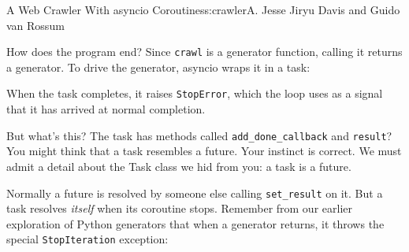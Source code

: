 \begin{aosachapter}{A Web Crawler With asyncio Coroutines}{s:crawler}{A. Jesse Jiryu Davis and Guido van Rossum}
\begin{Shaded}
\begin{Highlighting}[]
\end{Highlighting}
\end{Shaded}

How does the program end? Since \texttt{crawl} is a generator function,
calling it returns a generator. To drive the generator, asyncio wraps it
in a task:

\begin{Shaded}
\begin{Highlighting}[]
 
     
        \NormalTok{:}
         

 \NormalTok{):}

 
     
\end{Highlighting}
\end{Shaded}

When the task completes, it raises \texttt{StopError}, which the loop
uses as a signal that it has arrived at normal completion.

But what's this? The task has methods called
\texttt{add\_done\_callback} and \texttt{result}? You might think that a
task resembles a future. Your instinct is correct. We must admit a
detail about the Task class we hid from you: a task is a future.

\begin{Shaded}
\begin{Highlighting}[]
 
\end{Highlighting}
\end{Shaded}

Normally a future is resolved by someone else calling
\texttt{set\_result} on it. But a task resolves \emph{itself} when its
coroutine stops. Remember from our earlier exploration of Python
generators that when a generator returns, it throws the special
\texttt{StopIteration} exception:


\end{aosachapter}
